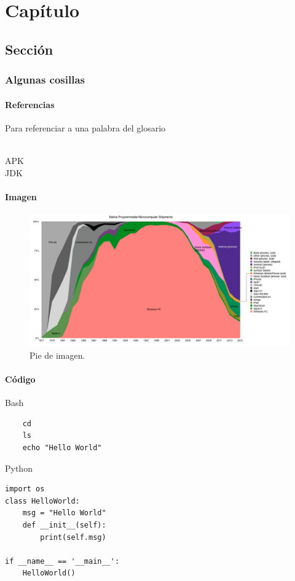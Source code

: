 \chapter{Capítulo}

\lipsum[1]

\section{Sección}

\lipsum[1]

\subsection{Algunas cosillas}


\subsubsection{Referencias}

Para referenciar a una palabra del glosario

 \\
\gls{APK} \\
\gls{JDK} \\
\cite{AngBenNadel}

\subsubsection{Imagen}

\begin{figure}[H]
\centering
  \includegraphics[width=\textwidth]{Figures/ch1/introduction/os_quota}
  \caption{Pie de imagen. }
\end{figure}

\subsubsection{Código}

Bash


\begin{verbatim}
    cd
    ls
    echo "Hello World"
\end{verbatim}

Python


\begin{verbatim}
import os
class HelloWorld:
    msg = "Hello World"
    def __init__(self):
        print(self.msg)

if __name__ == '__main__':
    HelloWorld()	
\end{verbatim}
